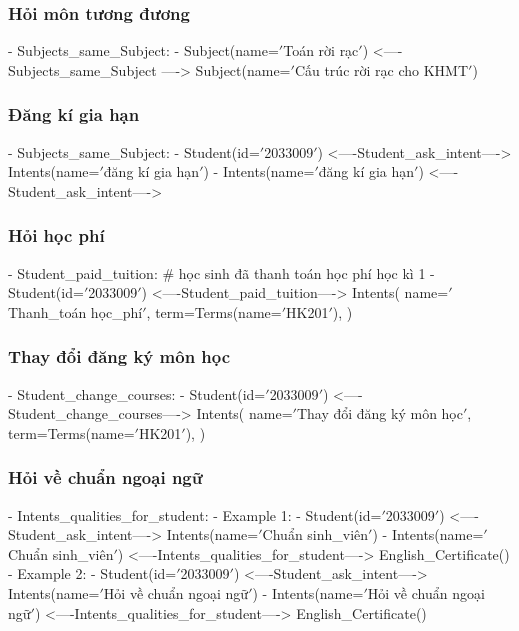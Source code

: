             \subsubsection{Hỏi môn tương đương}
            - Subjects\_same\_Subject:
                - Subject(name=\('\)Toán rời rạc\('\))  <----Subjects\_same\_Subject ----> Subject(name=\('\)Cấu trúc rời rạc cho KHMT\('\))

            \subsubsection{Đăng kí gia hạn}
            - Subjects\_same\_Subject:
                - Student(id=\('\)2033009\('\)) <----Student\_ask\_intent----> Intents(name=\('\)đăng kí gia hạn\('\))
                - Intents(name=\('\)đăng kí gia hạn\('\)) <----Student\_ask\_intent---->

            \subsubsection{Hỏi học phí}
            - Student\_paid\_tuition: # học sinh đã thanh toán học phí học kì 1
                - Student(id=\('\)2033009\('\))
                  <----Student\_paid\_tuition---->
                  Intents(
                  name=\('\)Thanh\_toán học\_phí\('\),
                  term=Terms(name=\('\)HK201\('\)),
                  )

            \subsubsection{Thay đổi đăng ký môn học}
            - Student\_change\_courses:
                - Student(id=\('\)2033009\('\))
                  <----Student\_change\_courses---->
                  Intents(
                  name=\('\)Thay đổi đăng ký môn học\('\),
                  term=Terms(name=\('\)HK201\('\)),
                  )
            \subsubsection{Hỏi về chuẩn ngoại ngữ}
            - Intents\_qualities\_for\_student:
                - Example 1:
                  - Student(id=\('\)2033009\('\)) <----Student\_ask\_intent----> Intents(name=\('\)Chuẩn sinh\_viên\('\))
                  - Intents(name=\('\)Chuẩn sinh\_viên\('\)) <----Intents\_qualities\_for\_student----> English\_Certificate()
                - Example 2:
                  - Student(id=\('\)2033009\('\)) <----Student\_ask\_intent----> Intents(name=\('\)Hỏi về chuẩn ngoại ngữ\('\))
                  - Intents(name=\('\)Hỏi về chuẩn ngoại ngữ\('\)) <----Intents\_qualities\_for\_student----> English\_Certificate()
